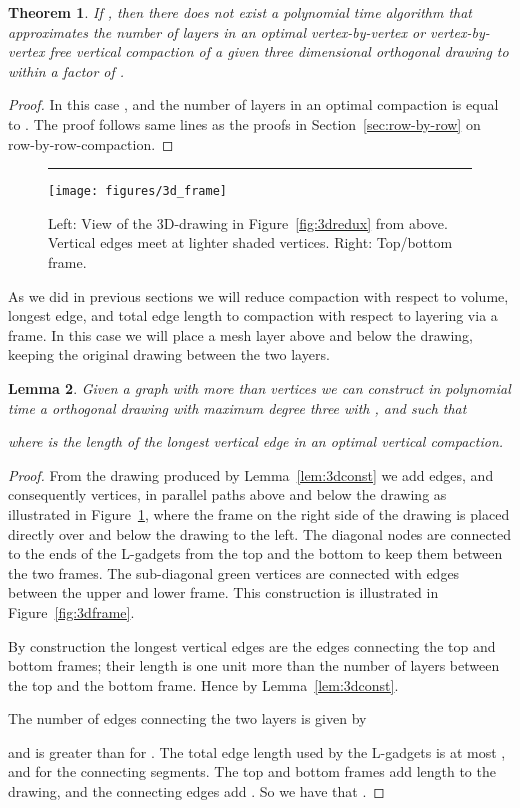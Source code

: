 \documentclass[12pt]{article}
\newtheorem{theorem}{Theorem}
\newtheorem{lemma}[theorem]{Lemma}
\theoremstyle{definitions}
\begin{document}
\begin{theorem}
If , then there does not exist a polynomial time algorithm that
approximates the number of layers in an optimal vertex-by-vertex or vertex-by-vertex free vertical compaction of a given
three dimensional orthogonal drawing to within a factor of .
\end{theorem}
\begin{proof}
In this case , and the number of layers in an optimal compaction is equal to . The proof follows same lines as the proofs in Section~\ref{sec:row-by-row} on row-by-row-compaction.
\end{proof}

\begin{figure}[b!]
\centering
{}\rule{2em}{0em}
\texttt{[image: figures/3d\_frame]}
\caption{Left: View of the 3D-drawing in Figure~\ref{fig:3dredux} from above. Vertical
edges meet at lighter shaded vertices. Right: Top/bottom frame.
}
\label{fig:3dreduxTopDown}
\end{figure}
As we did in previous sections we will reduce compaction with respect to volume,
longest edge, and total edge length to compaction with respect to layering via a frame. 
In this case we will place a mesh layer above and below the drawing, keeping the original drawing between the two layers.

\begin{lemma}
\label{lem:3dframe}
Given a graph  with more than  vertices we can construct in polynomial time a  orthogonal drawing  with maximum degree three with , and such that

where  is the length of the longest vertical edge in an optimal vertical compaction.
\end{lemma}
\begin{proof}
From the drawing produced by Lemma~\ref{lem:3dconst} we add  edges, and consequently  vertices, in  parallel paths above and below the drawing as illustrated in Figure~\ref{fig:3dreduxTopDown}, where the frame on the right side of the drawing is placed directly over and below the  drawing to the left. The diagonal nodes are connected to the ends of the L-gadgets from the top and the bottom to keep them between the two frames. The sub-diagonal green vertices are connected with edges between the upper and lower frame. This construction is illustrated in Figure~\ref{fig:3dframe}.

By construction the longest vertical edges are the edges connecting the top and bottom frames; their length is one unit more than the number of layers between the top and the bottom frame. Hence  by Lemma~\ref{lem:3dconst}.

The number of edges connecting the two layers is given by

and is greater than  for . The total edge length used by the L-gadgets is at most , and  for the connecting segments. The top and bottom frames add  length to the drawing, and the connecting edges add . So we have that .
\end{proof}
\end{document}
